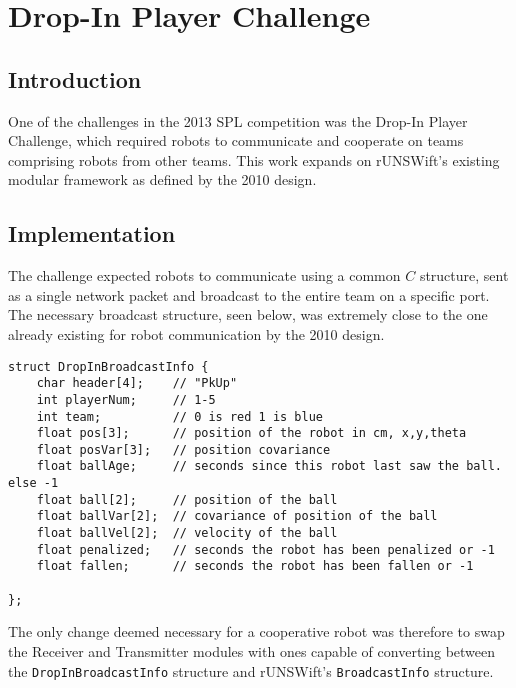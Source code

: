 \chapter{Drop-In Player Challenge}
\label{chap:misc}

\section{Introduction}

One of the challenges in the 2013 SPL competition was the Drop-In Player Challenge, which required robots to communicate and cooperate on teams comprising robots from other teams. This work expands on rUNSWift's existing modular framework as defined by the 2010 design\cite{runswift_2010}.

\section{Implementation}

The challenge expected robots to communicate using a common $C$ structure, sent as a single network packet and broadcast to the entire team on a specific port. The necessary broadcast structure, seen below, was extremely close to the one already existing for robot communication by the 2010 design. 

\begin{lstlisting}
struct DropInBroadcastInfo {
    char header[4];    // "PkUp"
    int playerNum;     // 1-5
    int team;          // 0 is red 1 is blue
    float pos[3];      // position of the robot in cm, x,y,theta
    float posVar[3];   // position covariance
    float ballAge;     // seconds since this robot last saw the ball. else -1
    float ball[2];     // position of the ball
    float ballVar[2];  // covariance of position of the ball
    float ballVel[2];  // velocity of the ball
    float penalized;   // seconds the robot has been penalized or -1
    float fallen;      // seconds the robot has been fallen or -1

};
\end{lstlisting}

The only change deemed necessary for a cooperative robot was therefore to swap the Receiver and Transmitter modules with ones capable of converting between the \texttt{DropInBroadcastInfo} structure and rUNSWift's \texttt{BroadcastInfo} structure.

